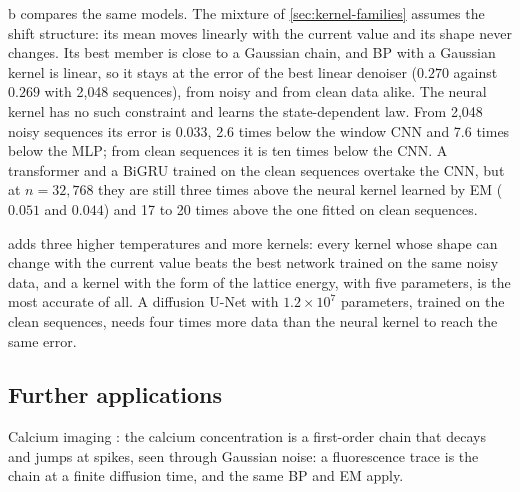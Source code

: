 \documentclass{article}
\begin{document}
b compares the same models. The mixture of \cref{sec:kernel-families} assumes the shift structure:
its mean moves linearly with the current value and its shape never changes. Its best member is close to a Gaussian
chain, and BP with a Gaussian kernel is linear, so it stays at the error of the best linear denoiser ($0.270$ against
$0.269$ with 2{,}048 sequences), from noisy and from clean data alike. The neural kernel has no such constraint and
learns the state-dependent law. From 2{,}048 noisy sequences its error is $0.033$, 2.6 times below the window CNN and
7.6 times below the MLP; from clean sequences it is ten times below the CNN. A transformer and a BiGRU trained on
the clean sequences overtake the CNN, but at $n=32{,}768$ they are still three times above the neural kernel learned
by EM ($0.051$ and $0.044$) and 17 to 20 times above the one fitted on clean sequences.

 adds three higher temperatures and more kernels: every kernel whose shape can change with the current
value beats the best network trained on the same noisy data, and a kernel with the form of the lattice energy, with five
parameters, is the most accurate of all. A diffusion U-Net with $1.2\times10^{7}$ parameters, trained on the clean
sequences, needs four times more data than the neural kernel to reach the same error.

\subsection{Further applications}
\label{sec:more-applications}

 Calcium imaging \cite{vogelstein2009spike,friedrich2017fast,berens2018community}: the calcium
concentration is a first-order chain that decays and jumps at spikes, seen through Gaussian noise: a fluorescence trace
is the chain at a finite diffusion time, and the same BP and EM apply.
\end{document}
